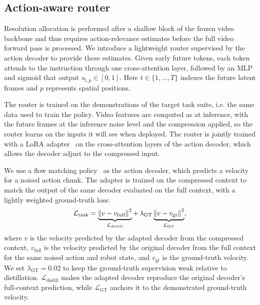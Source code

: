 \subsection{Action-aware router}
\label{sec:router}
Resolution allocation is performed after a shallow block of the frozen video backbone and thus requires action-relevance estimates before the full video forward pass is processed.
We introduce a lightweight router supervised by the action decoder to provide these estimates.
Given early future tokens, each token attends to the instruction through one cross-attention layer, followed by an MLP and sigmoid that output $s_{t,p}\in[0,1]$.
Here $t\in\{1,\dots,T\}$ indexes the future latent frames and $p$ represents spatial positions.


The router is trained on the demonstrations of the target task suite, i.e. the same data used to train the policy.
Video features are computed as at inference, with the future frames at the inference noise level and the compression applied,
so the router learns on the inputs it will see when deployed.
The router is jointly trained with a LoRA adapter~\cite{hu2022lora} on the cross-attention layers of the action decoder, which allows the decoder adjust to the compressed input.

We use a flow matching policy~\cite{lipman2023flow} as the action decoder, which predicts a velocity for a noised action chunk.
The adapter is trained on the compressed context to match the output of the same decoder evaluated on the full context, with a lightly weighted ground-truth loss:
\begin{equation}
  \mathcal{L}_{\text{task}} =
  \underbrace{\left\lVert v - v_{\text{full}}\right\rVert^2}_{\mathcal{L}_{\text{distill}}}
  + \, \lambda_{\text{GT}} \underbrace{\left\lVert v - v_{\text{gt}}\right\rVert^2}_{\mathcal{L}_{\text{GT}}} ,
  \label{eq:task_loss}
\end{equation}
where $v$ is the velocity predicted by the adapted decoder from the compressed context,
$v_{\text{full}}$ is the velocity predicted by the original decoder from the full context for the same noised action and robot state,
and $v_{\text{gt}}$ is the ground-truth velocity. We set $\lambda_{\text{GT}}=0.02$ to keep the ground-truth supervision weak relative to distillation.
$\mathcal{L}_{\text{distill}}$ makes the adapted decoder reproduce the original decoder's full-context prediction, while $\mathcal{L}_{\text{GT}}$ anchors it to the demonstrated ground-truth velocity.

